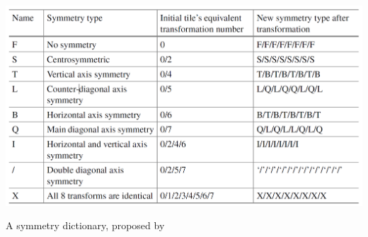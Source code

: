 \begin{table}[H]
    \centering
    \includegraphics[width=\textwidth, height=0.3\textheight, keepaspectratio]{Images/SymmetryDictionary.png}
    \caption{A symmetry dictionary, proposed by \cite{WFC_Automatic_Rules_And_Better_Symmetries}}
    \label{fig:symmetryDictionary}
\end{table}

